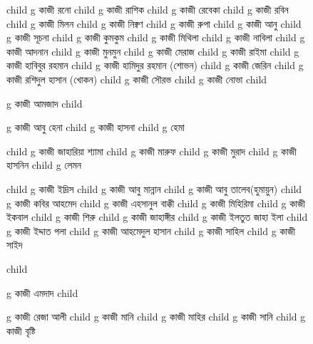\documentclass{article}
\begin{document}
\begin{figure}
{\begin{genealogypicture}
{{{{              child{    g{ কাজী রনো  } child{    g{ কাজী রাশিক  }   }   }
              child{    g{ কাজী রেবেকা } 
                  child{    g{ কাজী রবিন }   }
                  child{    g{ কাজী মিলন }   }
                  child{    g{ কাজী নিক্বণ }   }
                  child{    g{ কাজী রুপা }   }
              }
              child{    g{ কাজী আনু  } child{    g{ কাজী সূচনা }   }  }
              child{    g{ কাজী কুমকুম}
                    child{    g{ কাজী মিথিলা}   }
                    child{    g{ কাজী নাবিলা }   }
                    child{    g{ কাজী আদনান }   }
              }
              child{    g{ কাজী মুনমুন }
                  child{    g{ কাজী মেরাজ }   }
                  child{    g{ কাজী রাইমা }   }
              }
          }
          child{    g{ কাজী হাবিবুর রহমান }  
              child{    g{ কাজী হামিদুর রহমান (শোভন)  }
                  child{ g{ কাজী জেরিন }  }
              }
              child{    g{ কাজী রশিদুল হাসান (খোকন)  }
                  child{ g{ কাজী সৌরভ }  }
                  child{ g{ কাজী নোভা }  }
              }
          }
          child{    g{ কাজী আমজাদ } 
          child{    g{ কাজী আবু হেনা }
          child{ g{ কাজী হাসনা }
                child{ g{ হেমা }  }
            }

            child{ g{ কাজী জাহারিয়া শ্যামা  }   }
            child{ g{ কাজী মারুফ  }  }
            child{ g{ কাজী মুরাদ }  }
            child{ g{ কাজী হাসনিন }
                child{ g{ লেমন }  }
            }
          }
          child{    g{ কাজী ইদ্রিস }   }
          child{    g{ কাজী আবু মান্নান }   }
          child{   
            g{ কাজী আবু তালেব(হুমায়ুন)  }
              child{ g{ কাজী কবির আহমেদ  }  }
              child{ g{ কাজী এহসানুল বাক্কী }
                  child{ g{ কাজী মিহিরিমা }  }
              }
          }
          child{    g{ কাজী ইকবাল }   }
          child{    g{ কাজী শিরু }   }
          child{ g{ কাজী জাহাঙ্গীর }
              child{ g{ কাজী ইলতুত জাহা ইলা  }  }
              child{ g{ কাজী ইদ্দাত পলা }  }
              child{ g{ কাজী আহমেদুল হাসান }
                  child{ g{ কাজী সাহিল }  }
              }
          }
          child{    g{ কাজী সাইদ }   }
          }
          child{    g{ কাজী এমদাদ } 
              child{    g{ কাজী রেজা আলী } 
                    child{    g{ কাজী মানি }
                        child{    g{ কাজী মাহির   }     }
                          }
                    child{    g{ কাজী সানি } child{    g{ কাজী বৃষ্টি  }     }  }

}}}}}
\end{genealogypicture}}
\end{figure}
\end{document}
